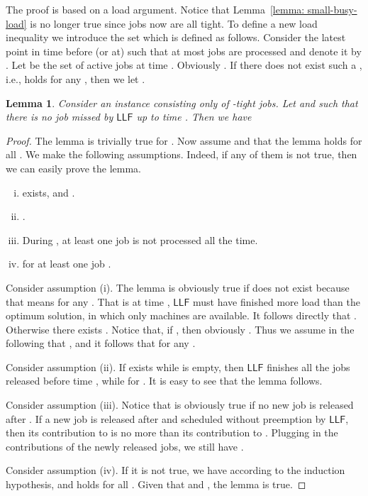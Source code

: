 \documentclass[letterpaper,11pt]{article}
\newtheorem{lemma}{Lemma}
\newcommand{\LLF}{\ensuremath{\mathsf{LLF}}\xspace}
\begin{document}
 The proof is based on a load argument. Notice that
 Lemma~\ref{lemma: small-busy-load} is no longer true since jobs
 now are all tight. To define a new load inequality we introduce the
 set  which is defined as follows. Consider the latest
 point in time before (or at)  such that at most  jobs are
 processed and denote it by . Let  be the set of active jobs at time
 . Obviously . If there does not exist
 such a , i.e.,  holds for any , then we let
 . 
\begin{lemma}
\label{lemma:mp-agreeable-LLF-load}
Consider an instance consisting only of -tight jobs. Let  and  such that there is no job missed by \LLF up to time . Then we have 
\end{lemma}



\begin{proof}
The lemma is trivially true for . Now assume  and that the lemma holds for all . We make the following assumptions. Indeed, if any of them is not true, then we can easily prove the lemma.

\begin{enumerate}[(i)]
\item  exists, and .
\item .
\item During , at least one job is not processed all the time.
\item  for at least one job .
\end{enumerate}

Consider assumption (i). The lemma is obviously true if  does not exist because that means  for any . That is at time , \LLF must have finished more load than the optimum solution, in which only  machines are available. It follows directly that .
Otherwise there exists . Notice that, if , then obviously . 
Thus we assume in the following that , and it follows that  for any . 

Consider assumption (ii). If  exists while  is empty, then \LLF finishes all the jobs released before time , while  for . It is easy to see that the lemma follows. 

Consider assumption (iii). Notice that  is obviously true if no new job is released after . If a new job is released after  and scheduled without preemption by \LLF, then its contribution to  is no more than its contribution to . Plugging in the contributions of the newly released jobs, we still have .

Consider assumption (iv). If it is not true, we have  according to the induction hypothesis, and  holds for all . Given that  and , the lemma is true. 


\end{proof}
\end{document}
